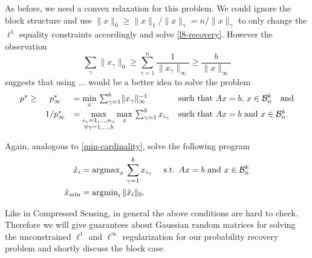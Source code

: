 \documentclass{article} %
\begin{document}
As before, we need a convex relaxation for this problem. We could ignore the block structure and use $\|x\|_0 \geq \|x\|_1/ \|x\|_{\gamma} = n/ \|x\|_{\gamma}$ to only change the $\ell^1$ equality constraints accordingly and solve \eqref{l8-recovery}. However the observation
\begin{equation*}
\sum_{\gamma}\|x_{\gamma}\|_0 \geq \sum_{\gamma=1}^n\frac{1}{\|x_{\gamma}\|_{\infty}} \geq \frac{b}{\|x\|_{\infty}}
\end{equation*}
suggests that using ... would be a better idea to solve the problem
\begin{equation}\label{block-l8-recovery}
  \begin{array}{rcllllr}
  p^* \geq& p_\infty^* &= \min\limits_x\, \sum_{\gamma = 1}^b\lVert x_{\gamma}\rVert_\infty^{-1}&\text{such that $Ax = b$, $x\in \mathcal B_n^k$}\quad \text{and}\\[5pt]
  &1/p_\infty^* &= \max\limits_{\substack{i_{\gamma} = 1, \dots, n_{\gamma}\\\forall \gamma = 1,\dots, b}} \max\limits_{x}\, \sum_{\gamma=1}^b x_{i_\gamma}&\text{such that $Ax = b$ and $x\in \mathcal B_n^k$.}
  \end{array}
\end{equation} 

Again,  analogous to \eqref{min-cardinality}, solve the following program
\begin{align}
\hat{x}_i &=  \operatorname{argmax}\limits_{x}\, \sum_{\gamma=1}^b x_{i_\gamma} \quad \text{ s.t. } Ax = b \text{ and } x\in \mathcal B_n^k \label{block-min-cardinality}\\
\hat{x}_{\min} &= \operatorname{argmin}\limits_{i} \|\hat{x}_i\|_0. \nonumber
\end{align}

Like in Compressed Sensing, in general the above conditions are hard to check. Therefore we will give guarantees about Gaussian random matrices for solving the unconstrained $\ell^1$ and $\ell^\infty$ regularization for our probability recovery problem and shortly discuss the block case.
\end{document}

